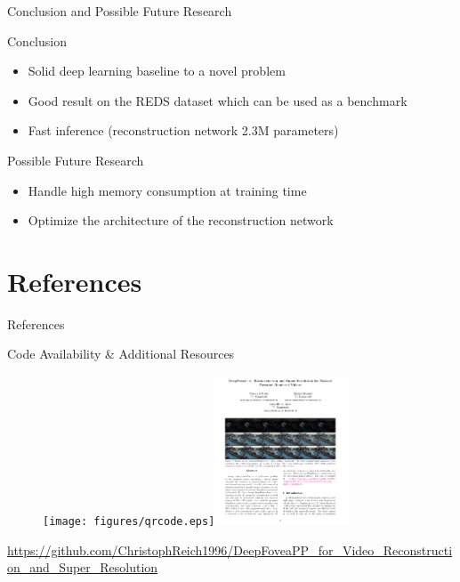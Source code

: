 \documentclass[
	ngerman,
	aspectratio=169,
	color={accentcolor=3d},
	logo=false,
	colorframetitle=true,
	]{tudabeamer}
\begin{document}

\begin{frame}{Conclusion and Possible Future Research}
    \begin{block}{Conclusion}
    \begin{itemize}
        \item Solid deep learning baseline to a novel problem
        \item Good result on the REDS dataset \cite{REDS} which can be used as a benchmark
        \item Fast inference (reconstruction network 2.3M parameters)
    \end{itemize}
    \end{block}
    \pause
    \begin{block}{Possible Future Research}
        \begin{itemize}
            \item Handle high memory consumption at training time
            \item Optimize the architecture of the reconstruction network 
        \end{itemize}
    \end{block}
\end{frame}


\section{References}

\begin{frame}[allowframebreaks]{References}
    
    
\end{frame}


\begin{frame}{Code Availability \& Additional Resources}
    \begin{figure}
        \centering
        \texttt{[image: figures/qrcode.eps]}\hspace{2.5cm}\includegraphics[width=4cm]{figures/paper.PNG}
    \end{figure}
    \begin{center}
        \begin{large}
            \url{https://github.com/ChristophReich1996/DeepFoveaPP_for_Video_Reconstruction_and_Super_Resolution}
        \end{large}
    \end{center}
\end{frame}
\end{document}
